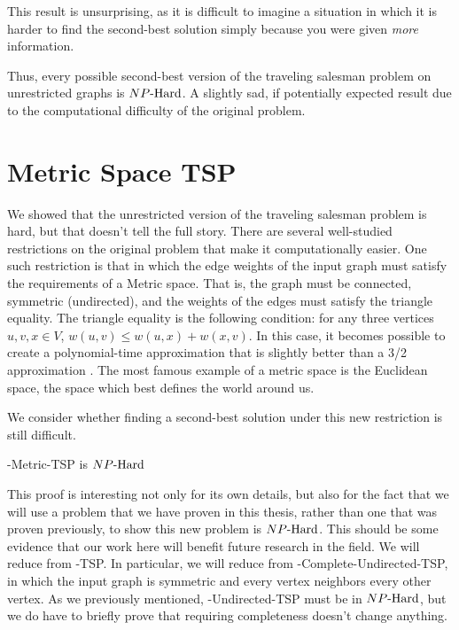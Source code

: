 This result is unsurprising, as it is difficult to imagine a situation in which it is harder to find the second-best solution simply because you were given \textit{more} information.

Thus, every possible second-best version of the traveling salesman problem on unrestricted graphs is ${NP\text{-Hard{}}}$. A slightly sad, if potentially expected result due to the computational difficulty of the original problem.

\section{Metric Space TSP}
We showed that the unrestricted version of the traveling salesman problem is hard, but that doesn't tell the full story. There are several well-studied restrictions on the original problem that make it computationally easier. One such restriction is that in which the edge weights of the input graph must satisfy the requirements of a Metric space. That is, the graph must be connected, symmetric (undirected), and the weights of the edges must satisfy the triangle equality. The triangle equality is the following condition: for any three vertices $u,v,x \in V$, $w(u,v) \leq w(u,x) + w(x,v)$. In this case, it becomes possible to create a polynomial-time approximation that is slightly better than a 3/2 approximation \cite{karlin2023slightly, christofides1976worst}. The most famous example of a metric space is the Euclidean space, the space which best defines the world around us. 

We consider whether finding a second-best solution under this new restriction is still difficult.
\begin{theorem}
    \inob{}-Metric-TSP is ${NP\text{-Hard{}}}$
\end{theorem}
This proof is interesting not only for its own details, but also for the fact that we will use a problem that we have proven in this thesis, rather than one that was proven previously, to show this new problem is ${NP\text{-Hard{}}}$. This should be some evidence that our work here will benefit future research in the field. We will reduce from \inob{}-TSP. In particular, we will reduce from \inob{}-Complete-Undirected-TSP, in which the input graph is symmetric and every vertex neighbors every other vertex. As we previously mentioned, \inob{}-Undirected-TSP must be in ${NP\text{-Hard{}}}$, but we do have to briefly prove that requiring completeness doesn't change anything.

